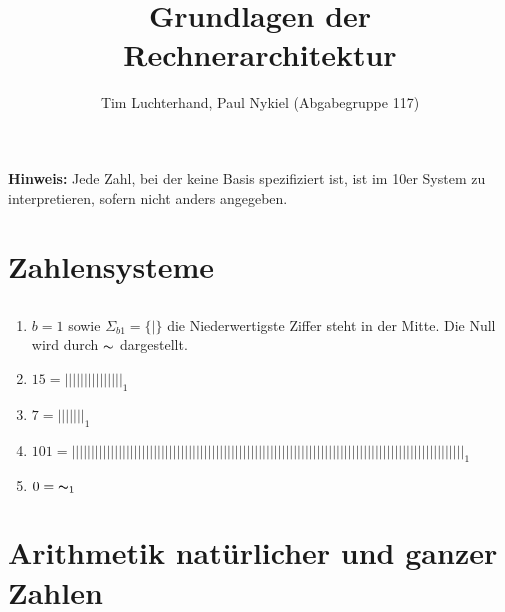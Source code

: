 \documentclass[DIN, pagenumber=false, fontsize=11pt, parskip=half]{scrartcl}
\title{Grundlagen der Rechnerarchitektur}
\author{Tim Luchterhand, Paul Nykiel (Abgabegruppe 117)}
\begin{document}
    \maketitle
    \textbf{Hinweis: } Jede Zahl, bei der keine Basis spezifiziert ist, ist im 10er System zu interpretieren, sofern nicht anders angegeben.
    \section{Zahlensysteme}
    \subsection{}
    \begin{enumerate}[label = (\alph*)]
        \item  $b = 1$ sowie $\Sigma_{b1} = \{|\}$ die Niederwertigste Ziffer steht in der Mitte. Die Null wird durch $\thicksim$ dargestellt.
        \item $15 = {||||| ||||| |||||}_1$
        \item $7 = {|| |||||}_1$
        \item $101 = {| 
            ||||| ||||| 
            ||||| ||||| 
            ||||| ||||| 
            ||||| ||||| 
            ||||| ||||| 
            ||||| ||||| 
            ||||| ||||| 
            ||||| ||||| 
            ||||| ||||| 
            ||||| |||||}_1$
        \item $0 = {\thicksim}_1$
    \end{enumerate}
    \section{Arithmetik natürlicher und ganzer Zahlen}
    \setcounter{subsection}{1}
\end{document}
